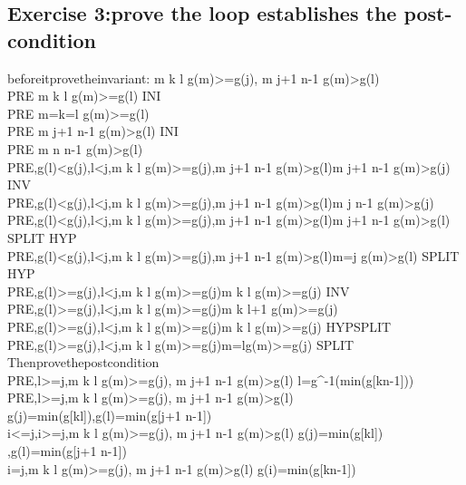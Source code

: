 \documentclass[11pt,a4paper,fleqn]{article}
\begin{document}
\subsection{Exercise 3:prove the loop establishes the post-condition}
\noindent
before\;it\;prove\;the\;invariant:\; \forall m \in k \upto l \Rightarrow g(m)>=g(j), \forall m \in j+1 \upto n-1 \Rightarrow g(m)>g(l) \\
PRE \vdash [l:=k]\forall m \in k \upto l \Rightarrow g(m)>=g(l) \;INI \\
PRE \vdash m=k=l \Rightarrow g(m)>=g(l) \\
PRE \vdash [j:=n-1]\forall m \in j+1 \upto n-1 \Rightarrow g(m)>g(l) \;INI \\
PRE \vdash \forall m \in n \upto n-1 \Rightarrow g(m)>g(l) \\
PRE,g(l)<g(j),l<j,\forall m \in k \upto l \Rightarrow g(m)>=g(j),\forall m \in j+1 \upto n-1 \Rightarrow g(m)>g(l)\vdash [j:=j-1]\forall m \in j+1 \upto n-1 \Rightarrow g(m)>g(j) \;INV \\
PRE,g(l)<g(j),l<j,\forall m \in k \upto l \Rightarrow g(m)>=g(j),\forall m \in j+1 \upto n-1 \Rightarrow g(m)>g(l)\vdash \forall m \in j \upto n-1 \Rightarrow g(m)>g(j) \\
PRE,g(l)<g(j),l<j,\forall m \in k \upto l \Rightarrow g(m)>=g(j),\forall m \in j+1 \upto n-1 \Rightarrow g(m)>g(l)\vdash \forall m \in j+1 \upto n-1 \Rightarrow g(m)>g(l) \; SPLIT \; HYP\\
PRE,g(l)<g(j),l<j,\forall m \in k \upto l \Rightarrow g(m)>=g(j),\forall m \in j+1 \upto n-1 \Rightarrow g(m)>g(l)\vdash  m=j \Rightarrow g(m)>g(l) \; SPLIT \; HYP\\
PRE,g(l)>=g(j),l<j,\forall m \in k \upto l \Rightarrow g(m)>=g(j)\vdash [l:=l+1]\forall m \in k \upto l \Rightarrow g(m)>=g(j) \;INV \\
PRE,g(l)>=g(j),l<j,\forall m \in k \upto l \Rightarrow g(m)>=g(j)\vdash \forall m \in k \upto l+1 \Rightarrow g(m)>=g(j) \\
PRE,g(l)>=g(j),l<j,\forall m \in k \upto l \Rightarrow g(m)>=g(j)\vdash \forall m \in k \upto l \Rightarrow g(m)>=g(j) \;HYP\;SPLIT\\
PRE,g(l)>=g(j),l<j,\forall m \in k \upto l \Rightarrow g(m)>=g(j)\vdash m=l\Rightarrow g(m)>=g(j) \;SPLIT\\
\noindent
Then\;prove\;the\;post\;condition \\
PRE,l>=j,\forall m \in k \upto l \Rightarrow g(m)>=g(j), \forall m \in j+1 \upto n-1 \Rightarrow g(m)>g(l) \vdash l=g^{-1}(min(g[k\upto n-1])) \\
PRE,l>=j,\forall m \in k \upto l \Rightarrow g(m)>=g(j), \forall m \in j+1 \upto n-1 \Rightarrow g(m)>g(l) \vdash g(j)=min(g[k\upto l]),g(l)=min(g[j+1 \upto n-1])\\
i<=j,i>=j,\forall m \in k \upto l \Rightarrow g(m)>=g(j), \forall m \in j+1 \upto n-1 \Rightarrow g(m)>g(l) \vdash g(j)=min(g[k\upto l]) ,g(l)=min(g[j+1 \upto n-1])\\
i=j,\forall m \in k \upto l \Rightarrow g(m)>=g(j), \forall m \in j+1 \upto n-1 \Rightarrow g(m)>g(l) \vdash g(i)=min(g[k\upto n-1]) \\







%
%
\end{document}
